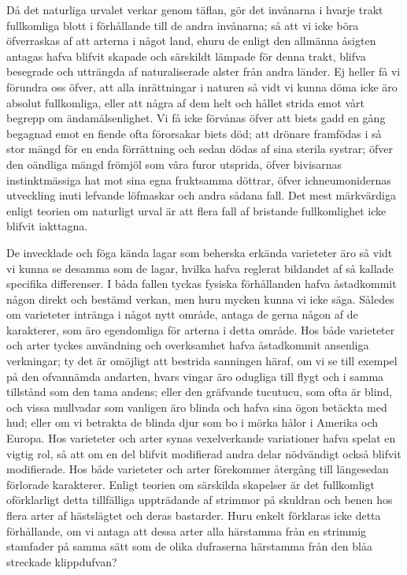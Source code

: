 Då det naturliga urvalet verkar genom täflan, gör det invånarna i hvarje trakt fullkomliga blott i förhållande till de andra invånarna; så att vi icke böra öfverraskas af att arterna i något land, ehuru de enligt den allmänna åsigten antagas hafva blifvit skapade och särskildt lämpade för denna trakt, blifva besegrade och utträngda af naturaliserade alster från andra länder. Ej heller få vi förundra oss öfver, att alla inrättningar i naturen så vidt vi kunna döma icke äro absolut fullkomliga, eller att några af dem helt och hållet strida emot vårt begrepp om ändamålsenlighet. Vi få icke förvånas öfver att biets gadd en gång begagnad emot en fiende ofta förorsakar biets död; att drönare framfödas i så stor mängd för en enda förrättning och sedan dödas af sina sterila systrar; öfver den oändliga mängd frömjöl som våra furor utsprida, öfver bivisarnas instinktmässiga hat mot sina egna fruktsamma döttrar, öfver ichneumonidernas utveckling inuti lefvande löfmaskar och andra sådana fall. Det mest märkvärdiga enligt teorien om naturligt urval är att flera fall af bristande fullkomlighet icke blifvit iakttagna.

De invecklade och föga kända lagar som beherska erkända varieteter äro så vidt vi kunna se desamma som de lagar, hvilka hafva reglerat bildandet af så kallade specifika differenser. I båda fallen tyckas fysiska förhållanden hafva åstadkommit någon direkt och bestämd verkan, men huru mycken kunna vi icke säga. Således om varieteter intränga i något nytt område, antaga de gerna någon af de karakterer, som äro egendomliga för arterna i detta område. Hos både varieteter och arter tyckes användning och overksamhet hafva åstadkommit ansenliga verkningar; ty det är omöjligt att bestrida sanningen häraf, om vi se till exempel på den ofvannämda andarten, hvars vingar äro odugliga till flygt och i samma tillstånd som den tama andens; eller den gräfvande tucutucu, som ofta är blind, och vissa mullvadar som vanligen äro blinda och hafva sina ögon betäckta med hud; eller om vi betrakta de blinda djur som bo i mörka hålor i Amerika och Europa. Hos varieteter och arter synas vexelverkande variationer hafva spelat en vigtig rol, så att om en del blifvit modifierad andra delar nödvändigt också blifvit modifierade. Hos både varieteter och arter förekommer återgång till längesedan förlorade karakterer. Enligt teorien om särskilda skapelser är det fullkomligt oförklarligt detta tillfälliga uppträdande af strimmor på skuldran och benen hos flera arter af hästslägtet och deras bastarder. Huru enkelt förklaras icke detta förhållande, om vi antaga att dessa arter alla härstamma från en strimmig stamfader på samma sätt som de olika dufraserna härstamma från den blåa streckade klippdufvan?

